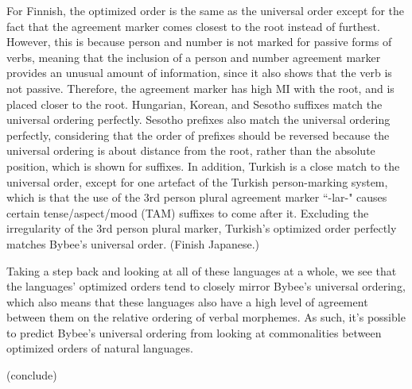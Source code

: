 \documentclass[11pt,letterpaper]{article}
\newcommand\becky[1]{{\color{blue}(#1)}}
\begin{document}
For Finnish, the optimized order is the same as the universal order except for the fact that the agreement marker comes closest to the root instead of furthest. However, this is because person and number is not marked for passive forms of verbs, meaning that the inclusion of a person and number agreement marker provides an unusual amount of information, since it also shows that the verb is not passive. Therefore, the agreement marker has high MI with the root, and is placed closer to the root. 
Hungarian, Korean, and Sesotho suffixes match the universal ordering perfectly. 
Sesotho prefixes also match the universal ordering perfectly, considering that the order of prefixes should be reversed because the universal ordering is about distance from the root, rather than the absolute position, which is shown for suffixes.
In addition, Turkish is a close match to the universal order, except for one artefact of the Turkish person-marking system, which is that the use of the 3rd person plural agreement marker ``-lar-" causes certain tense/aspect/mood (TAM) suffixes to come after it. Excluding the irregularity of the 3rd person plural marker, Turkish's optimized order perfectly matches Bybee's universal order. 
\becky{Finish Japanese.}

Taking a step back and looking at all of these languages at a whole, we see that the languages' optimized orders tend to closely mirror Bybee's universal ordering, which also means that these languages also have a high level of agreement between them on the relative ordering of verbal morphemes. As such, it's possible to predict Bybee's universal ordering from looking at commonalities between optimized orders of natural languages. 


\becky{conclude}
\end{document}
